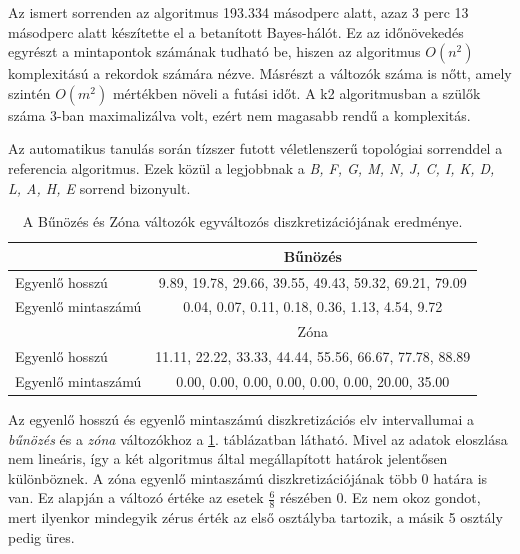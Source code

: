 Az ismert sorrenden az algoritmus 193.334 másodperc alatt, azaz 3 perc 13 másodperc alatt készítette el a betanított Bayes-hálót. Ez az időnövekedés egyrészt a mintapontok számának tudható be, hiszen az algoritmus $O(n^2)$ komplexitású a rekordok számára nézve. Másrészt a változók száma is nőtt, amely szintén $O(m^2)$ mértékben növeli a futási időt. A k2 algoritmusban a szülők száma 3-ban maximalizálva volt, ezért nem magasabb rendű a komplexitás.

Az automatikus tanulás során tízszer futott véletlenszerű topológiai sorrenddel a referencia algoritmus. Ezek közül a legjobbnak a \emph{B, F, G, M, N, J, C, I, K, D, L, A, H, E} sorrend bizonyult.

\begin{table}[htp]\centering
    \begin{tabular}{lc}
            & Bűnözés                                                          \\ \hline
    Egyenlő hosszú     & 9.89,  19.78,    29.66,  39.55,  49.43,    59.32,  69.21,  79.09 \\
    Egyenlő mintaszámú & 0.04,  0.07,    0.11,  0.18,  0.36,    1.13,  4.54,  9.72       \\ \hline

    & Zóna                                                              \\ \hline
    Egyenlő hosszú     & 11.11,  22.22,    33.33,  44.44,  55.56,    66.67,  77.78,  88.89 \\
    Egyenlő mintaszámú & 0.00,  0.00,    0.00,  0.00,  0.00,    0.00,  20.00,  35.00
    \end{tabular}
\caption{A Bűnözés és Zóna változók egyváltozós diszkretizációjának eredménye.}
\label{tab:housing_egyszeru_intervallumok}
\end{table}

Az egyenlő hosszú és egyenlő mintaszámú diszkretizációs elv intervallumai a \emph{bűnözés} és a \emph{zóna} változókhoz a \ref{tab:housing_egyszeru_intervallumok}. táblázatban látható. Mivel az adatok eloszlása nem lineáris, így a két algoritmus által megállapított határok jelentősen különböznek. A zóna egyenlő mintaszámú diszkretizációjának több 0 határa is van. Ez alapján a változó értéke az esetek $\frac{6}{8}$ részében 0. Ez nem okoz gondot, mert ilyenkor mindegyik zérus érték az első osztályba tartozik, a másik 5 osztály pedig üres.

